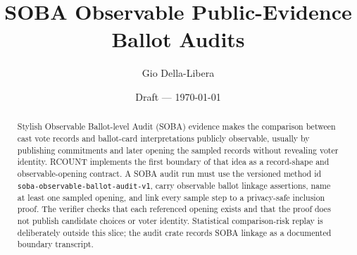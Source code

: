 \documentclass[12pt]{article}
\title{SOBA Observable Public-Evidence Ballot Audits}
\author{Gio Della-Libera}
\date{Draft --- \today}
\begin{document}
\maketitle

\begin{abstract}
Stylish Observable Ballot-level Audit (SOBA) evidence makes the comparison
between cast vote records and ballot-card interpretations publicly observable,
usually by publishing commitments and later opening the sampled records without
revealing voter identity. RCOUNT implements the first boundary of that idea as
a record-shape and observable-opening contract. A SOBA audit run must use the
versioned method id \texttt{soba-observable-ballot-audit-v1}, carry observable
ballot linkage assertions, name at least one sampled opening, and link every
sample step to a privacy-safe inclusion proof. The verifier checks that each
referenced opening exists and that the proof does not publish candidate choices
or voter identity. Statistical comparison-risk replay is deliberately outside
this slice; the audit crate records SOBA linkage as a documented boundary
transcript.
\end{abstract}








\nocite{rcount-overview-2026,rcount-v4-2026}


\end{document}
